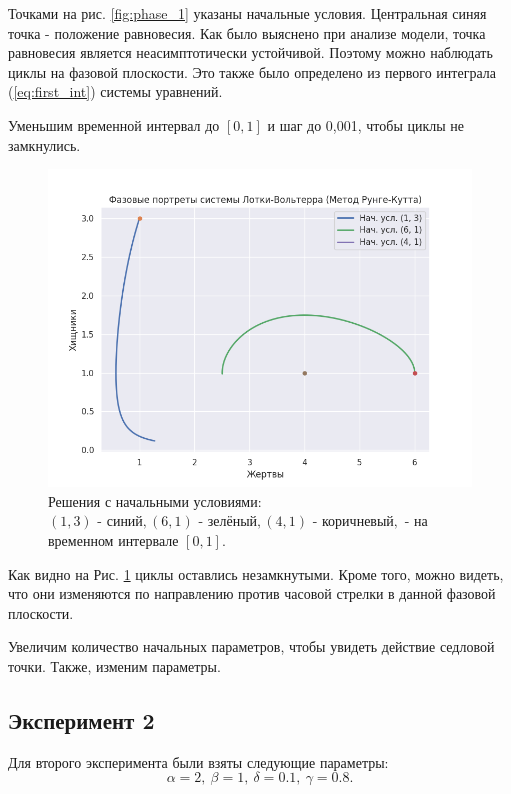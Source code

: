 Точками на рис. \ref{fig:phase_1} указаны начальные условия. Центральная синяя точка - положение равновесия. Как было выяснено при анализе модели, точка равновесия является неасимптотически устойчивой. Поэтому можно наблюдать циклы на фазовой плоскости. Это также было определено из первого интеграла (\ref{eq:first_int}) системы уравнений.

Уменьшим временной интервал до $[0,1]$ и шаг до 0,001, чтобы циклы не замкнулись.
\begin{figure}[h]  %
	\centering
	\includegraphics[width=1\textwidth]{imgs/phase_1_1.png}  %
	\caption{Решения с начальными условиями: $(1,3)\text{ - синий}, (6,1)\text{ - зелёный}, (4,1)\text{ - коричневый}, $ - на временном интервале $[0,1]$.}  %
	\label{fig:phase_1_1}  %
\end{figure}

Как видно на Рис. \ref{fig:phase_1_1} циклы оставлись незамкнутыми. Кроме того, можно видеть, что они изменяются по направлению против часовой стрелки в данной фазовой плоскости.

Увеличим количество начальных параметров, чтобы увидеть действие седловой точки. Также, изменим параметры.
\newpage
\subsection*{Эксперимент 2}
Для второго эксперимента были взяты следующие параметры: $$\alpha = 2, \ \beta = 1, \ \delta = 0.1, \ \gamma = 0.8.$$

